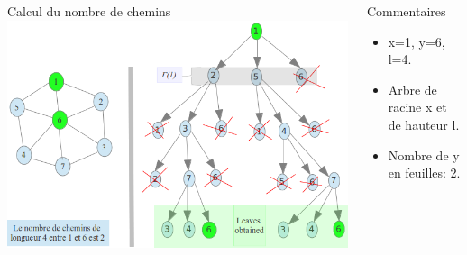 \documentclass[10pt]{beamer}
\begin{document}
\begin{frame}
\begin{columns}[T]
    \begin{column}{.55\textwidth}
    \begin{block}{Calcul du nombre de chemins}
      \includegraphics[scale=0.29]{images/exemple_d_execution.png}
    \end{block}
    \end{column}
    \begin{column}{.4\textwidth}
    \begin{block}{Commentaires}
      \begin{itemize}
       \item x=1, y=6, l=4.
       \item Arbre de racine x et de hauteur l.
       \item Nombre de y en feuilles: 2.
      \end{itemize}

    \end{block}
    \end{column}
  \end{columns}
\end{frame}
\end{document}
